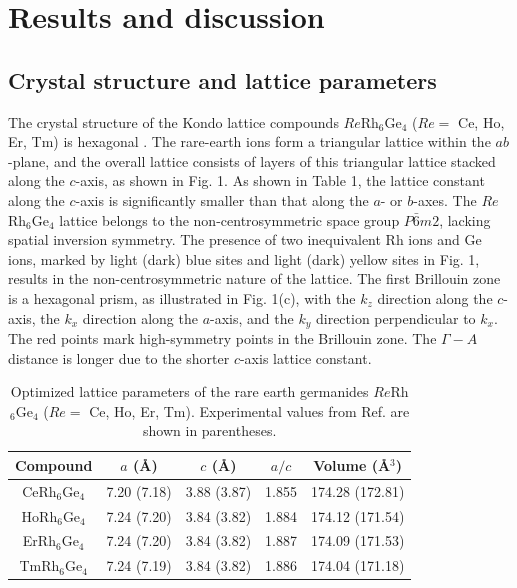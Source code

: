 \documentclass[preprint,12pt]{elsarticle}
\begin{document}
\section{Results and discussion}

\subsection{Crystal structure and lattice parameters}

The crystal structure of the Kondo lattice compounds $Re$Rh$_6$Ge$_4$ ($Re =$ Ce, Ho, Er, Tm) is hexagonal \cite{vosswinkel2013new}. The rare-earth ions form a triangular lattice within the $ab$-plane, and the overall lattice consists of layers of this triangular lattice stacked along the $c$-axis, as shown in Fig. 1. As shown in Table 1, the lattice constant along the $c$-axis is significantly smaller than that along the $a$- or $b$-axes. The $Re$Rh$_6$Ge$_4$ lattice belongs to the non-centrosymmetric space group $P\bar{6}m2$, lacking spatial inversion symmetry. The presence of two inequivalent Rh ions and Ge ions, marked by light (dark) blue sites and light (dark) yellow sites in Fig. 1, results in the non-centrosymmetric nature of the lattice. The first Brillouin zone is a hexagonal prism, as illustrated in Fig. 1(c), with the $k_z$ direction along the $c$-axis, the $k_x$ direction along the $a$-axis, and the $k_y$ direction perpendicular to $k_x$. The red points mark high-symmetry points in the Brillouin zone. The $\Gamma - A$ distance is longer due to the shorter $c$-axis lattice constant.

\begin{table}[h]
\caption{Optimized lattice parameters of the rare earth germanides $Re$Rh$_6$Ge$_4$ ($Re =$ Ce, Ho, Er, Tm). Experimental values from Ref. \cite{vosswinkel2013new} are shown in parentheses.}
\label{tab:lattice}
\begin{tabular}{c c c c c}
\hline
Compound & $a$ (\AA) & $c$ (\AA) & $a/c$ & Volume (\AA$^3$) \\
\hline
CeRh$_6$Ge$_4$ & 7.20 (7.18) & 3.88 (3.87) & 1.855 & 174.28 (172.81) \\
HoRh$_6$Ge$_4$ & 7.24 (7.20) & 3.84 (3.82) & 1.884 & 174.12 (171.54) \\
ErRh$_6$Ge$_4$ & 7.24 (7.20) & 3.84 (3.82) & 1.887 & 174.09 (171.53) \\
TmRh$_6$Ge$_4$ & 7.24 (7.19) & 3.84 (3.82) & 1.886 & 174.04 (171.18) \\
\hline
\end{tabular}
\end{table}
\end{document}
